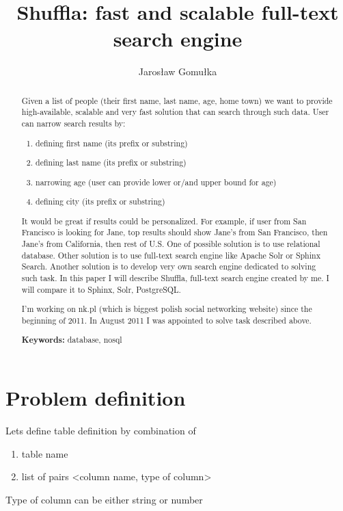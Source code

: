 \documentclass[10pt,a4paper]{article}
\begin{document}
\title{Shuffla: fast and scalable full-text search engine}
\author{Jarosław Gomułka}

\maketitle

\begin{abstract}
Given a list of people (their first name, last name, age, home town) we want to provide high-available, scalable and very fast solution that can search through such data.
User can narrow search results by:

\bigskip
\begin{enumerate}
\item{defining first name (its prefix or substring)}
\item{defining last name (its prefix or substring)}
\item{narrowing age (user can provide lower or/and upper bound for age)}
\item{defining city (its prefix or substring)}
\end{enumerate}

\bigskip
It would be great if results could be personalized. For example, if user from San Francisco is looking for Jane, top results should show Jane's from San Francisco, then Jane's from California, then rest of U.S. One of possible solution is to use relational database. Other solution is to use full-text search engine like Apache Solr or Sphinx Search. Another solution is to develop very own search engine dedicated to solving such task. In this paper I will describe Shuffla, full-text search engine created by me. I will compare it to Sphinx, Solr, PostgreSQL. 

\bigskip
I'm working on nk.pl (which is biggest polish social networking website) since the beginning of 2011. In August 2011 I was appointed to solve task described above. 

\bigskip
\noindent \textbf{Keywords:} database, nosql
\end{abstract}


\section{Problem definition}

Lets define table definition by combination of
\begin{enumerate}
\item table name
\item list of pairs <column name, type of column>
\end{enumerate}
Type of column can be either string or number
\end{document}
